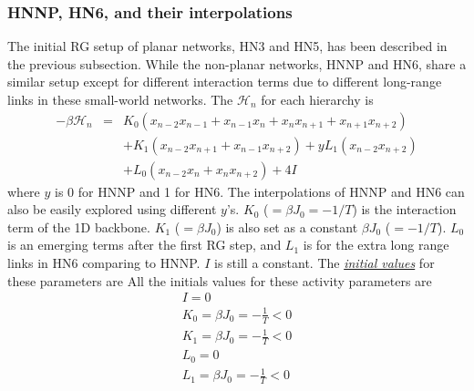 \subsubsection{ HNNP, HN6, and their interpolations }
The initial RG setup of planar networks, HN3 and HN5, has been described in the previous subsection. While the non-planar networks, HNNP and HN6, share a similar setup except for different interaction terms due to different long-range links in these small-world networks. The $\mathcal{H}_n$ for each hierarchy is 
\begin{eqnarray}
 -\beta \mathcal{H}_n &=& K_0 \left(x_{n-2}x_{n-1} + x_{n-1}x_{n} +  x_{n}x_{n+1} +  x_{n+1}x_{n+2}\right) \nonumber \\ 
   && + K_1(x_{n-2}x_{n+1} + x_{n-1}x_{n+2}) + yL_1(x_{n-2} x_{n+2}) \nonumber \\
   && +L_0(x_{n-2}x_{n} + x_{n}x_{n+2})  + 4I 
\label{eq:hp-z0}
\end{eqnarray}
where $y$ is 0 for HNNP and 1 for HN6. The interpolations of HNNP and HN6 can also be easily explored using different $y$'s. $K_0$ ($=\beta J_0= -1/T$) is the interaction term of the 1D backbone. $K_1$ ($=\beta J_0$) is also set as a constant $\beta J_0$ ($=-1/T$). $L_0$ is an emerging terms after the first RG step, and $L_1$ is for the extra long range links in HN6 comparing to HNNP. $I$ is still a constant. The \underline{\emph{initial values}} for these parameters are All the initials values for these activity parameters are
\begin{equation}
\begin{array}{l}
\displaystyle I = 0 \\
\displaystyle K_0 =\beta J_0=-\frac{1}{T} < 0 \\
\displaystyle K_1 =\beta J_0=-\frac{1}{T}  < 0 \\
\displaystyle L_0 = 0 \\
\displaystyle L_1 =\beta J_0 =-\frac{1}{T} < 0 \\
\end{array} 
\label{eq:hp-init1}
\end{equation}

